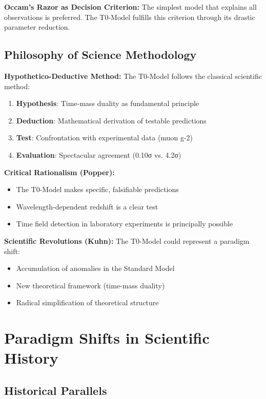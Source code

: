 \documentclass[12pt,a4paper]{report}
\begin{document}
	\textbf{Occam's Razor as Decision Criterion:}
	The simplest model that explains all observations is preferred. The T0-Model fulfills this criterion through its drastic parameter reduction.
	
	\subsection{Philosophy of Science Methodology}\label{subsec:philosophy_science_methodology}
	
	\textbf{Hypothetico-Deductive Method:}
	The T0-Model follows the classical scientific method:
	\begin{enumerate}
		\item \textbf{Hypothesis}: Time-mass duality as fundamental principle
		\item \textbf{Deduction}: Mathematical derivation of testable predictions
		\item \textbf{Test}: Confrontation with experimental data (muon g-2)
		\item \textbf{Evaluation}: Spectacular agreement (0.10σ vs. 4.2σ)
	\end{enumerate}
	
	\textbf{Critical Rationalism (Popper):}
	\begin{itemize}
		\item The T0-Model makes specific, falsifiable predictions
		\item Wavelength-dependent redshift is a clear test
		\item Time field detection in laboratory experiments is principally possible
	\end{itemize}
	
	\textbf{Scientific Revolutions (Kuhn):}
	The T0-Model could represent a paradigm shift:
	\begin{itemize}
		\item Accumulation of anomalies in the Standard Model
		\item New theoretical framework (time-mass duality)
		\item Radical simplification of theoretical structure
	\end{itemize}
	
	\section{Paradigm Shifts in Scientific History}\label{sec:paradigm_shifts}
	
	\subsection{Historical Parallels}\label{subsec:historical_parallels}
	
\end{document}
